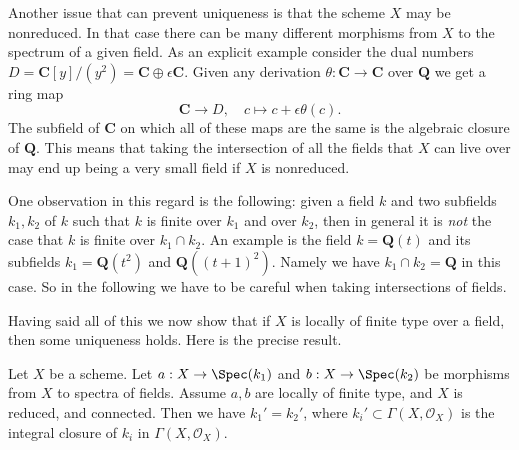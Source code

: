 \medskip\noindent
Another issue that can prevent uniqueness is that the scheme $X$ may
be nonreduced. In that case there can be many different morphisms
from $X$ to the spectrum of a given field. As an explicit example consider
the dual numbers
$D = \mathbf{C}[y]/(y^2) = \mathbf{C} \oplus \epsilon \mathbf{C}$.
Given any derivation $\theta : \mathbf{C} \to \mathbf{C}$ over $\mathbf{Q}$
we get a ring map
$$
\mathbf{C} \longrightarrow D, \quad
c \longmapsto c + \epsilon \theta(c).
$$
The subfield of $\mathbf{C}$ on which all of these maps are the same
is the algebraic closure of $\mathbf{Q}$. This means that taking the
intersection of all the fields that $X$ can live over may end up
being a very small field if $X$ is nonreduced.

\medskip\noindent
One observation in this regard is the following: given a field
$k$ and two subfields $k_1, k_2$ of $k$ such that $k$ is finite
over $k_1$ and over $k_2$, then in general it is {\it not} the case
that $k$ is finite over $k_1 \cap k_2$. An example is the field
$k = \mathbf{Q}(t)$ and its subfields $k_1 = \mathbf{Q}(t^2)$ and
$\mathbf{Q}((t + 1)^2)$. Namely we have $k_1 \cap k_2 = \mathbf{Q}$
in this case. So in the following we have to be careful when taking
intersections of fields.

\medskip\noindent
Having said all of this we now show that if $X$ is locally of finite
type over a field, then some uniqueness holds. Here is the precise
result.

\begin{proposition}
\label{proposition-unique-base-field}
Let $X$ be a scheme. Let $a : X \to \Spec(k_1)$ and
$b : X \to \Spec(k_2)$ be morphisms from $X$ to spectra of fields.
Assume $a, b$ are locally of finite type, and
$X$ is reduced, and connected. Then we have
$k_1' = k_2'$, where $k_i' \subset \Gamma(X, \mathcal{O}_X)$ is
the integral closure of $k_i$ in $\Gamma(X, \mathcal{O}_X)$.
\end{proposition}

